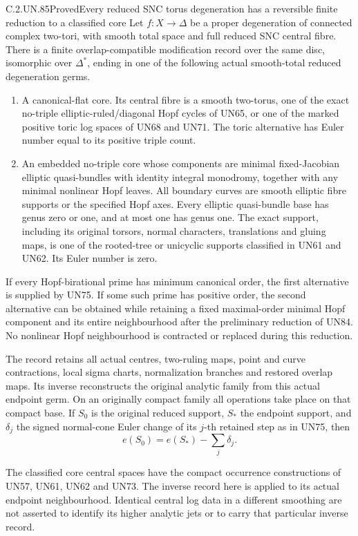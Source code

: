 \begin{statement}{C.2.UN.85}{Proved}{Every reduced SNC torus degeneration has a reversible finite reduction to a classified core}
Let \(f:X\to\Delta\) be a proper degeneration of connected
complex two-tori, with smooth total space and full reduced
SNC central fibre. There is a finite overlap-compatible
modification record over the same disc, isomorphic over
\(\Delta^*\), ending in one of the following actual
smooth-total reduced degeneration germs.

\begin{enumerate}
\item A canonical-flat core. Its central fibre is a smooth
two-torus, one of the exact no-triple elliptic-ruled/diagonal
Hopf cycles of UN65, or one of the marked positive toric
log spaces of UN68 and UN71. The toric alternative has
Euler number equal to its positive triple count.

\item An embedded no-triple core whose components are
minimal fixed-Jacobian elliptic quasi-bundles with identity
integral monodromy, together with any minimal nonlinear
Hopf leaves. All boundary curves are smooth elliptic fibre
supports or the specified Hopf axes. Every elliptic
quasi-bundle base has genus zero or one, and at most one
has genus one. The exact support, including its original
torsors, normal characters, translations and gluing maps,
is one of the rooted-tree or unicyclic supports classified
in UN61 and UN62. Its Euler number is zero.
\end{enumerate}

If every Hopf-birational prime has minimum canonical order,
the first alternative is supplied by UN75. If some such
prime has positive order, the second alternative can be
obtained while retaining a fixed maximal-order minimal
Hopf component and its entire neighbourhood after the
preliminary reduction of UN84. No nonlinear Hopf
neighbourhood is contracted or replaced during this
reduction.

The record retains all actual centres, two-ruling maps,
point and curve contractions, local sigma charts,
normalization branches and restored overlap maps.
Its inverse reconstructs the original analytic family
from this actual endpoint germ. On an originally compact
family all operations take place on that compact base.
If \(S_0\) is the original reduced support, \(S_*\) the
endpoint support, and \(\delta_j\) the signed normal-cone
Euler change of its \(j\)-th retained step as in UN75,
then
\[
                 e(S_0)=e(S_*)-\sum_j\delta_j.
 \tag{C.GP.1}
\]

The classified core central spaces have the compact
occurrence constructions of UN57, UN61, UN62 and UN73.
The inverse record here is applied to its actual endpoint
neighbourhood. Identical central log data in a different
smoothing are not asserted to identify its higher analytic
jets or to carry that particular inverse record.
\end{statement}

